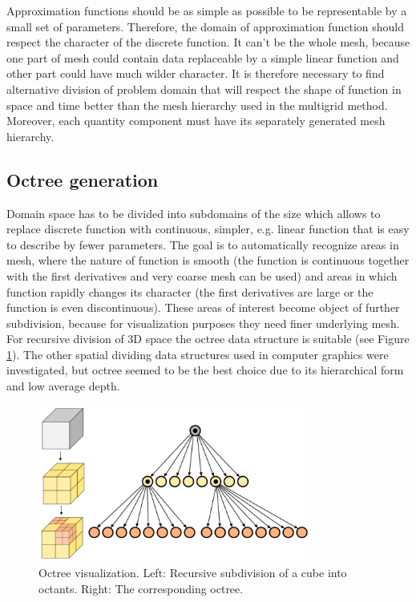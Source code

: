 Approximation functions should be as simple as possible to be representable by a small set of parameters. Therefore, the domain of approximation function should respect the character of the discrete function. It can’t be the whole mesh, because one part of mesh could contain data replaceable by a simple linear function and other part could have much wilder character. It is therefore necessary to find alternative division of problem domain that will respect the shape of function in space and time better than the mesh hierarchy used in the multigrid method. Moreover, each quantity component must have its separately generated mesh hierarchy.


\subsection{Octree generation}

Domain space has to be divided into subdomains of the size which allows to replace discrete function with continuous, simpler, e.g. linear function that is easy to describe by fewer parameters. The goal is to automatically recognize areas in mesh, where the nature of function is smooth (the function is continuous together with the first derivatives and very coarse mesh can be used) and areas in which function rapidly changes its character (the first derivatives are large or the function is even discontinuous). These areas of interest become object of further subdivision, because for visualization purposes they need finer underlying mesh. For recursive division of 3D space the octree data structure is suitable (see Figure \ref{fig:octree-visualization}). The other spatial dividing data structures used in computer graphics were investigated, but octree seemed to be the best choice due to its hierarchical form and low average depth.

\begin{figure}[H]
\centering
\includegraphics[width=0.8\textwidth]{figures/chapter-approximation/figure1}
\decoRule
\caption[Octree visualization]{Octree visualization. Left: Recursive subdivision of a cube into octants. Right: The corresponding octree.}
\label{fig:octree-visualization}
\end{figure}

